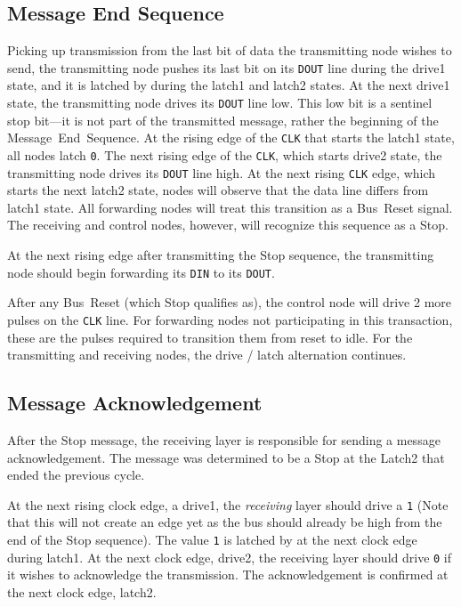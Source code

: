 \subsection{Message End Sequence}
\label{sec:protocol-end}
Picking up transmission from the last bit of data the transmitting node wishes
to send, the transmitting node pushes its last bit on its {\tt DOUT} line
during the {\sc drive1} state, and it is latched by \bus during the {\sc
latch1} and {\sc latch2} states.  At the next {\sc drive1} state, the 
transmitting node drives its {\tt DOUT} line low. This low bit is a sentinel 
stop bit---it is not part of the transmitted message, rather the beginning of 
the Message~End~Sequence. At the rising edge of the {\tt CLK} that starts the
{\sc latch1} state, all \bus nodes latch {\tt 0}. The next rising edge of the
{\tt CLK}, which starts {\sc drive2} state, the transmitting node drives its 
{\tt DOUT} line high. At the next rising {\tt CLK} edge, which starts the next 
{\sc latch2} state, nodes will observe that the data line differs from 
{\sc latch1} state. All forwarding nodes will treat this transition as a 
Bus~Reset signal. The receiving and control nodes, however, will recognize 
this sequence as a Stop.

At the next rising edge after transmitting the Stop sequence, the transmitting
node should begin forwarding its {\tt DIN} to its {\tt DOUT}.

After any Bus~Reset (which Stop qualifies as), the control node will drive 2
more pulses on the {\tt CLK} line. For forwarding nodes not participating in
this transaction, these are the pulses required to transition them from {\sc
reset} to {\sc idle}. For the transmitting and receiving nodes, the {\sc
drive} / {\sc latch} alternation continues.

\subsection{Message Acknowledgement}
\label{sec:protocol-ack}
After the Stop message, the receiving layer is responsible for sending a
message acknowledgement. The message was determined to be a Stop at the {\sc
Latch2} that ended the previous cycle.

At the next rising clock edge, a {\sc drive1}, the {\em receiving} layer
should drive a {\tt 1} (Note that this will not create an edge yet as the bus
should already be high from the end of the Stop sequence). The value {\tt 1}
is latched by \bus at the next clock edge during {\sc latch1}. At the next
clock edge, {\sc drive2}, the receiving layer should drive {\tt 0} if it
wishes to acknowledge the transmission. The acknowledgement is confirmed at
the next clock edge, {\sc latch2}.

